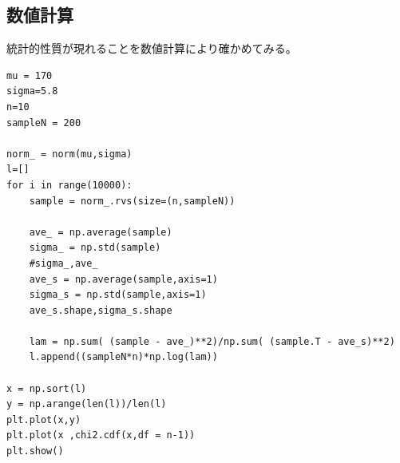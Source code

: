 \subsection{数値計算}
統計的性質が現れることを数値計算により確かめてみる。
\begin{lstlisting}
mu = 170
sigma=5.8
n=10
sampleN = 200

norm_ = norm(mu,sigma)
l=[]
for i in range(10000):
    sample = norm_.rvs(size=(n,sampleN))

    ave_ = np.average(sample)
    sigma_ = np.std(sample) 
    #sigma_,ave_
    ave_s = np.average(sample,axis=1)
    sigma_s = np.std(sample,axis=1)
    ave_s.shape,sigma_s.shape

    lam = np.sum( (sample - ave_)**2)/np.sum( (sample.T - ave_s)**2)
    l.append((sampleN*n)*np.log(lam))

x = np.sort(l)
y = np.arange(len(l))/len(l)
plt.plot(x,y)
plt.plot(x ,chi2.cdf(x,df = n-1))
plt.show()
\end{lstlisting}